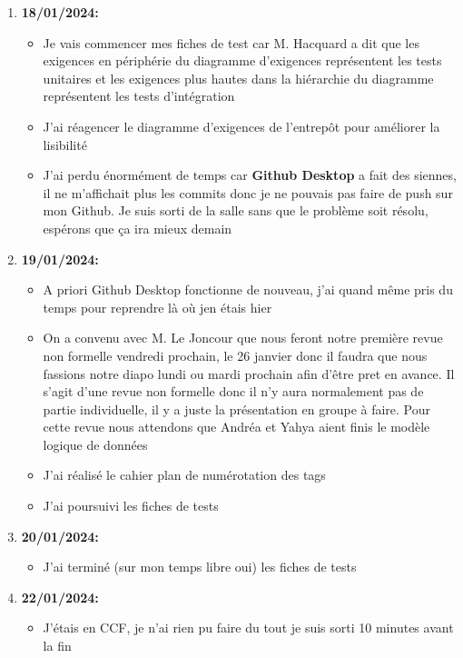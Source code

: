 \documentclass[10pt,a4paper]{book}
\begin{document}
\begin{enumerate}
    \item \textbf{18/01/2024:}
        \begin{itemize}
            \item Je vais commencer mes fiches de test car M. Hacquard a dit que les exigences en périphérie du diagramme d'exigences représentent les tests unitaires et les exigences plus hautes dans la hiérarchie du diagramme représentent les tests d'intégration
            \item J'ai réagencer le diagramme d'exigences de l'entrepôt pour améliorer la lisibilité
            \item J'ai perdu énormément de temps car \textbf{Github Desktop} a fait des siennes, il ne m'affichait plus les commits donc je ne pouvais pas faire de push sur mon Github. Je suis sorti de la salle sans que le problème soit résolu, espérons que ça ira mieux demain
        \end{itemize}
    \item \textbf{19/01/2024:}
        \begin{itemize}
            \item A priori Github Desktop fonctionne de nouveau, j'ai quand même pris du temps pour reprendre là où jen étais hier
            \item On a convenu avec M. Le Joncour que nous feront notre première revue non formelle vendredi prochain, le 26 janvier donc il faudra que nous fassions notre diapo lundi ou mardi prochain afin d'être pret en avance. Il s'agit d'une revue non formelle donc il n'y aura normalement pas de partie individuelle, il y a juste la présentation en groupe à faire. Pour cette revue nous attendons que Andréa et Yahya aient finis le modèle logique de données
            \item J'ai réalisé le cahier plan de numérotation des tags
            \item J'ai poursuivi les fiches de tests
        \end{itemize}
    \item \textbf{20/01/2024:}
        \begin{itemize}
            \item J'ai terminé (sur mon temps libre oui) les fiches de tests
        \end{itemize}
    \item \textbf{22/01/2024:}
        \begin{itemize}
            \item J'étais en CCF, je n'ai rien pu faire du tout je suis sorti 10 minutes avant la fin

\end{itemize}
\end{enumerate}
\end{document}
